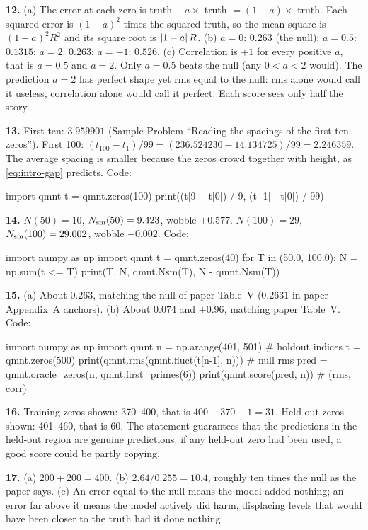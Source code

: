 \textbf{12.} (a) The error at each zero is truth $-\,a\times$ truth $= (1-a)\times$ truth. Each squared error is $(1-a)^2$ times the squared truth, so the mean square is $(1-a)^2R^2$ and its square root is $\left\lvert 1-a\right\rvert R$. (b) $a = 0$: $0.263$ (the null); $a = 0.5$: $0.1315$; $a = 2$: $0.263$; $a = -1$: $0.526$. (c) Correlation is $+1$ for every positive $a$, that is $a = 0.5$ and $a = 2$. Only $a=0.5$ beats the null (any $0<a<2$ would). The prediction $a=2$ has perfect shape yet rms equal to the null: rms alone would call it useless, correlation alone would call it perfect. Each score sees only half the story.

\textbf{13.} First ten: $3.959901$ (Sample Problem ``Reading the spacings of the first ten zeros''). First 100: $(t_{100} - t_1)/99 = (236.524230 - 14.134725)/99 = 2.246359$. The average spacing is smaller because the zeros crowd together with height, as \cref{eq:intro-gap} predicts. Code:
\begin{pycode}
import qmnt
t = qmnt.zeros(100)
print((t[9] - t[0]) / 9, (t[-1] - t[0]) / 99)
\end{pycode}

\textbf{14.} $N(50) = 10$, $N_{\mathrm{sm}}(50) = 9.423$, wobble $+0.577$. $N(100) = 29$, $N_{\mathrm{sm}}(100) = 29.002$, wobble $-0.002$. Code:
\begin{pycode}
import numpy as np
import qmnt
t = qmnt.zeros(40)
for T in (50.0, 100.0):
    N = np.sum(t <= T)
    print(T, N, qmnt.Nsm(T), N - qmnt.Nsm(T))
\end{pycode}

\textbf{15.} (a) About $0.263$, matching the null of paper Table~V ($0.2631$ in paper Appendix~A anchors). (b) About $0.074$ and $+0.96$, matching paper Table~V. Code:
\begin{pycode}
import numpy as np
import qmnt
n = np.arange(401, 501)                  # holdout indices
t = qmnt.zeros(500)
print(qmnt.rms(qmnt.fluct(t[n-1], n)))   # null rms
pred = qmnt.oracle_zeros(n, qmnt.first_primes(6))
print(qmnt.score(pred, n))               # (rms, corr)
\end{pycode}

\textbf{16.} Training zeros shown: 370--400, that is $400 - 370 + 1 = 31$. Held-out zeros shown: 401--460, that is $60$. The statement guarantees that the predictions in the held-out region are genuine predictions: if any held-out zero had been used, a good score could be partly copying.

\textbf{17.} (a) $200 + 200 = 400$. (b) $2.64/0.255 = 10.4$, roughly ten times the null as the paper says. (c) An error equal to the null means the model added nothing; an error far above it means the model actively did harm, displacing levels that would have been closer to the truth had it done nothing.

